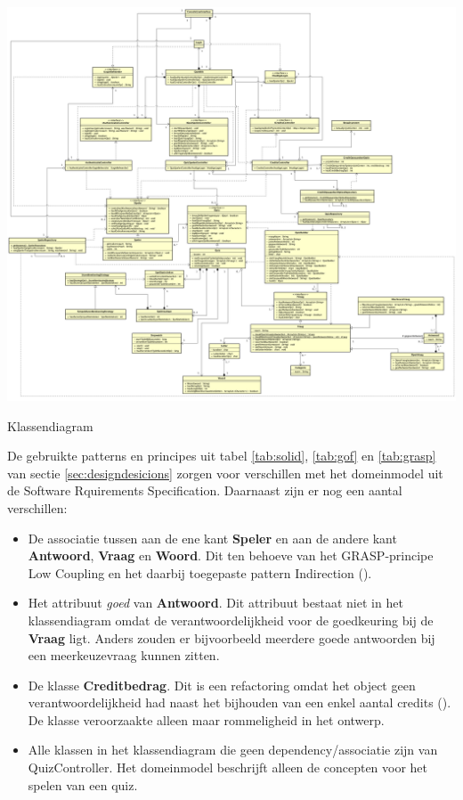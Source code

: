 \begin{mpfigure}
    \includegraphics[width=\linewidth]{../Afbeeldingen/Klassendiagram.png}
    \caption{Klassendiagram}
    \label{fig:klassendiagram}
\end{mpfigure}

\noindent\begin{minipage}{\linewidth}
    De gebruikte patterns en principes uit tabel \ref{tab:solid}, \ref{tab:gof} en \ref{tab:grasp} van sectie \ref{sec:designdesicions} zorgen voor verschillen met het domeinmodel uit de Software Rquirements Specification. Daarnaast zijn er nog een aantal verschillen:
    \begin{itemize}
        \item De associatie tussen aan de ene kant \textbf{Speler} en aan de andere kant \textbf{Antwoord}, \textbf{Vraag} en \textbf{Woord}. Dit ten behoeve van het GRASP-principe Low Coupling en het daarbij toegepaste pattern Indirection (\cite{larman}).
        \item Het attribuut \textit{goed} van \textbf{Antwoord}. Dit attribuut bestaat niet in het klassendiagram omdat de verantwoordelijkheid voor de goedkeuring bij de \textbf{Vraag} ligt. Anders zouden er bijvoorbeeld meerdere goede antwoorden bij een meerkeuzevraag kunnen zitten.
        \item De klasse \textbf{Creditbedrag}. Dit is een refactoring omdat het object geen verantwoordelijkheid had naast het bijhouden van een enkel aantal credits (\cite{inlineclass}). De klasse veroorzaakte alleen maar rommeligheid in het ontwerp.
        \item Alle klassen in het klassendiagram die geen dependency/associatie zijn van QuizController. Het domeinmodel beschrijft alleen de concepten voor het spelen van een quiz.
    \end{itemize}
\end{minipage}

